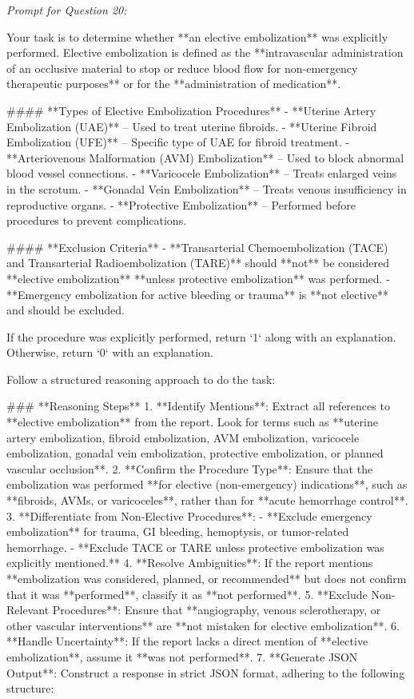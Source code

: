\textit{\normalsize Prompt for Question  20:}
\begin{mdframed}[]
\normalsize

Your task is to determine whether **an elective embolization** was explicitly performed. Elective embolization is defined as the **intravascular administration of an occlusive material to stop or reduce blood flow for non-emergency therapeutic purposes** or for the **administration of medication**.  

#### **Types of Elective Embolization Procedures**  
- **Uterine Artery Embolization (UAE)** – Used to treat uterine fibroids.  
- **Uterine Fibroid Embolization (UFE)** – Specific type of UAE for fibroid treatment.  
- **Arteriovenous Malformation (AVM) Embolization** – Used to block abnormal blood vessel connections.  
- **Varicocele Embolization** – Treats enlarged veins in the scrotum.  
- **Gonadal Vein Embolization** – Treats venous insufficiency in reproductive organs.  
- **Protective Embolization** – Performed before procedures to prevent complications.  

#### **Exclusion Criteria**  
- **Transarterial Chemoembolization (TACE) and Transarterial Radioembolization (TARE)** should **not** be considered **elective embolization** **unless protective embolization** was performed.  
- **Emergency embolization for active bleeding or trauma** is **not elective** and should be excluded.  

If the procedure was explicitly performed, return `1` along with an explanation. Otherwise, return `0` with an explanation.

Follow a structured reasoning approach to do the task:

### **Reasoning Steps**  
1. **Identify Mentions**: Extract all references to **elective embolization** from the report. Look for terms such as **uterine artery embolization, fibroid embolization, AVM embolization, varicocele embolization, gonadal vein embolization, protective embolization, or planned vascular occlusion**.  
2. **Confirm the Procedure Type**: Ensure that the embolization was performed **for elective (non-emergency) indications**, such as **fibroids, AVMs, or varicoceles**, rather than for **acute hemorrhage control**.  
3. **Differentiate from Non-Elective Procedures**:  
   - **Exclude emergency embolization** for trauma, GI bleeding, hemoptysis, or tumor-related hemorrhage.  
   - **Exclude TACE or TARE unless protective embolization was explicitly mentioned.**  
4. **Resolve Ambiguities**: If the report mentions **embolization was considered, planned, or recommended** but does not confirm that it was **performed**, classify it as **not performed**.  
5. **Exclude Non-Relevant Procedures**: Ensure that **angiography, venous sclerotherapy, or other vascular interventions** are **not mistaken for elective embolization**.  
6. **Handle Uncertainty**: If the report lacks a direct mention of **elective embolization**, assume it **was not performed**.  
7. **Generate JSON Output**: Construct a response in strict JSON format, adhering to the following structure:  

\end{mdframed}

